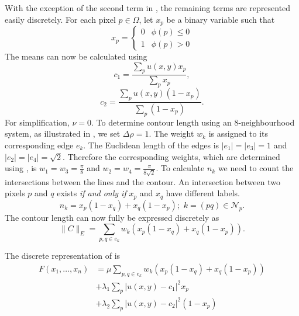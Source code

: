 \begin{definition}
	With the exception of the second term in , the remaining terms are represented easily discretely. For each pixel $p \in \Omega$, let $x_p$ be a binary variable such that
	\begin{equation}
		x_p = 
		\begin{cases} 
			0 & \phi(p)\leq 0 \\
			1 & \phi(p)> 0
		\end{cases}
	\end{equation}
	The means can now be calculated using 
	\begin{equation}
		c_1 = \frac{\sum_p u(x,y)x_p}{\sum_p x_p},
	\end{equation}
	\begin{equation}
		c_2 = \frac{\sum_p u(x,y)(1-x_p)}{\sum_p (1-x_p)}.
	\end{equation}
	For simplification, $\nu=0$. To determine contour length using an 8-neighbourhood system, as illustrated in , we set $\Delta\rho=1$. The weight $w_k$ is assigned to its corresponding edge $e_k$. The Euclidean length of the  edges is $|e_1|=|e_3| = 1$ and $|e_2|=|e_4|=\sqrt{2}$. Therefore the corresponding weights, which are determined using , is $w_1 = w_3 = \frac{\pi}{8}$ and $w_2 = w_4 = \frac{\pi}{8\sqrt{2}}$. To calculate $n_k$ we need to count the intersections between the lines and the contour. An intersection between two pixels $p$ and $q$ exists \textit{if and only if} $x_p$ and $x_q$ have different labels.
	\begin{equation}
		n_{k} = x_p(1-x_q) + x_q(1-x_p) \text{; } \, k={(pq) \in \mathcal{N}_p}. 
	\end{equation}
	The contour length can now fully be expressed discretely as 
	\begin{equation}
		\lVert C \rVert_E = \sum_{p,q \in e_k} w_k( x_p(1-x_q) + x_q(1-x_p)).
	\end{equation}
	
	The discrete representation of  is
	\begin{equation}
		\begin{split}
			F(x_1, \ldots, x_n) & = \mu \sum_{p,q \in e_k} w_k( x_p(1-x_q) + x_q(1-x_p)) \\
			& + \lambda_1 \sum_p |u(x,y)-c_1|^2x_p \\
			& + \lambda_2 \sum_p |u(x,y)-c_2|^2(1-x_p)
		\end{split}
		\label{eq:discretemumfordshah}
	\end{equation}
\end{definition}


